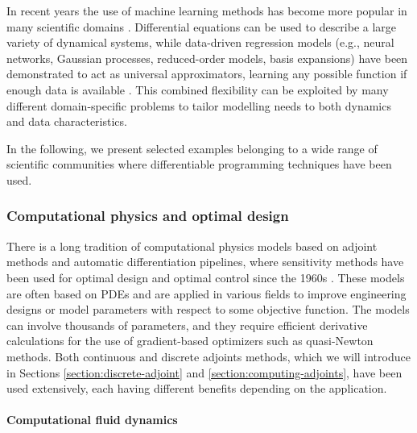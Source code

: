 In recent years the use of machine learning methods has become more popular in many scientific domains \cite{rasp2018, pichler2023, meuwly2021machine, borowiec2022}. 
Differential equations can be used to describe a large variety of dynamical systems, while data-driven regression models (e.g., neural networks, Gaussian processes, reduced-order models, basis expansions) have been demonstrated to act as universal approximators, learning any possible function if enough data is available \cite{gorban_1998}. 
This combined flexibility can be exploited by many different domain-specific problems to tailor modelling needs to both dynamics and data characteristics.

In the following, we present selected examples belonging to a wide range of scientific communities where differentiable programming techniques have been used. 

\subsubsection{Computational physics and optimal design}

There is a long tradition of computational physics models based on adjoint methods and automatic differentiation pipelines, where sensitivity methods have been used for optimal design and optimal control since the 1960s \cite{lions1971optimal}. 
These models are often based on PDEs and are applied in various fields to improve engineering designs or model parameters with respect to some objective function. 
The models can involve thousands of parameters, and they require efficient derivative calculations for the use of gradient-based optimizers such as quasi-Newton methods. 
Both continuous and discrete adjoints methods, which we will introduce in Sections \ref{section:discrete-adjoint} and \ref{section:computing-adjoints}, have been used extensively, each having different benefits depending on the application.

\paragraph{Computational fluid dynamics}

